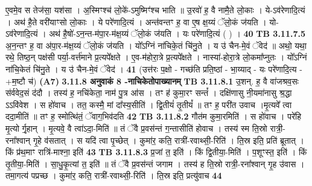 \documentclass[17pt]{extarticle}
\begin{document}
{{{{{{{{{{{{{{{{{{{{{{                  ए॒वमे॒व स तेज॑सा॒ यश॑सा । अ॒स्मिꣳश्च॑ लो॒के॑-ऽमुष्मिꣳ॑श्च भाति ॥ उ॒रवो॑ ह॒ वै नामै॒ते लो॒काः । ये-ऽव॑रेणादि॒त्यं । अथ॑ है॒ते वरी॑याꣳसो लो॒काः । ये परे॑णादि॒त्यं । अन्त॑वन्तꣳ ह॒ वा ए॒ष क्ष॒य्यं ॅलो॒कं ज॑यति । यो-ऽव॑रेणादि॒त्यं । अथ॑ है॒षो॑-ऽन॒न्त-म॑पा॒र-म॑क्ष॒य्यं ॅलो॒कं ज॑यति । यः परे॑णादि॒त्यं ( ) । \textbf{ 40} \newline
                  \newline
                                \textbf{ TB 3.11.7.5} \newline
                  अ॒न॒न्तꣳ ह॒ वा अ॑पा॒र-म॑क्ष॒य्यं ॅलो॒कं ज॑यति । यो᳚ऽग्निं ना॑चिके॒तं चि॑नु॒ते । य उ॑ चैन-मे॒वं ॅवेद॑ ॥ अथो॒ यथा॒ रथे॒ तिष्ठ॒न् पक्ष॑सी पर्या॒-वर्त्त॑माने प्र॒त्यपे᳚क्षते । ए॒व-म॑होरा॒त्रे प्र॒त्यपे᳚क्षते । नास्या॑-होरा॒त्रे लो॒कमा᳚प्नुतः । यो᳚ऽग्निं ना॑चि॒केतं चि॑नु॒ते । य उ॑ चैन-मे॒वं ॅवेद॑ । \textbf{ 41} \newline
                  \newline
                                    (उत्त॑रः प॒क्षो - गच्छ॑ति प्रति॒ष्ठां - भा॒य्याद् - यः परे॑णादि॒त्य - +म॒ष्टौ च॑) \textbf{(A7)} \newline \newline
                \textbf{ 3.11.8    अनुवाकं   8 -नाचिकेतोपाख्यानम्} \newline
                                \textbf{ TB 3.11.8.1} \newline
                  उ॒शन्. ह॒ वै वा॑जश्रव॒सः स॑र्ववेद॒सं द॑दौ । तस्य॑ ह॒ नचि॑केता॒ नाम॑ पु॒त्र आ॑स । तꣳ ह॑ कुमा॒रꣳ सन्तं᳚ । दक्षि॑णासु नी॒यमा॑नासु श्र॒द्धा ऽऽवि॑वेश । स हो॑वाच । तत॒ कस्मै॒ मां दा᳚स्य॒सीति॑ । द्वि॒तीयं॑ तृ॒तीयं᳚ ॥ तꣳ ह॒ परी॑त उवाच ।मृ॒त्यवे᳚ त्वा ददा॒मीति॑ ॥ तꣳ ह॒ स्मोत्थि॑तं॒ ॅवाग॒भिव॑दति \textbf{ 42} \newline
                  \newline
                                \textbf{ TB 3.11.8.2} \newline
                  गौत॑म कुमा॒रमिति॑ । स हो॑वाच । परे॑हि मृ॒त्यो र्गृ॒हान् । मृ॒त्यवे॒ वै त्वा॑ऽदा॒-मिति॑ ॥ तं ॅवै प्र॒वस॑न्तं ग॒न्तासीति॑ होवाच । तस्य॑ स्म ति॒स्रो रात्री॒-रना᳚श्वान् गृ॒हे व॑सतात् । स यदि॑ त्वा पृ॒च्छेत् । कुमा॑र॒ कति॒ रात्री॑-रवाथ्सी॒-रिति॑ । ति॒स्र इति॒ प्रति॑ ब्रूतात् । किं प्र॑थ॒माꣳ रात्रि॑-माश्ना॒ इति॑ \textbf{ 43} \newline
                  \newline
                                \textbf{ TB 3.11.8.3} \newline
                  प्र॒जां त॒ इति॑ । किं द्वि॒तीया॒-मिति॑ । प॒शूꣳस्त॒ इति॑ । किं तृ॒तीया॒-मिति॑ । सा॒धु॒कृ॒त्यां त॒ इति॑ ॥ तं ॅवै प्र॒वस॑न्तं जगाम । तस्य॑ ह ति॒स्रो रात्री॒-रना᳚श्वान् गृ॒ह उ॑वास । तमा॒गत्य॑ पप्रच्छ । कुमा॑र॒ कति॒ रात्री॑-रवाथ्सी॒-रिति॑ । ति॒स्र इति॒ प्रत्यु॑वाच \textbf{ 44} \newline
}}}}}}}}}}}}}}}}}}}}}}
\end{document}
